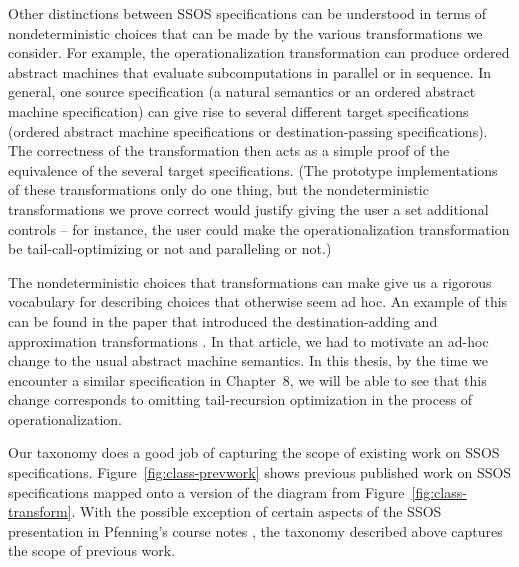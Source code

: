 Other distinctions between SSOS specifications can be understood in
terms of nondeterministic choices that can be made by the various
transformations we consider. For example, the operationalization
transformation can produce ordered abstract machines that evaluate
subcomputations in parallel or in sequence. In general, one source
specification (a natural semantics or an ordered abstract machine
specification) can give rise to several different target
specifications (ordered abstract machine specifications or
destination-passing specifications). The correctness of the
transformation then acts as a simple proof of the equivalence of the
several target specifications. (The prototype implementations of these
transformations only do one thing, but the nondeterministic
transformations we prove correct would justify giving the user a set
additional controls -- for instance, the user could make the
operationalization transformation be tail-call-optimizing or
not and paralleling or not.)

The nondeterministic choices that transformations can make give us a
rigorous vocabulary for describing choices that otherwise seem
ad hoc. An example of this can be found in the paper that introduced
the destination-adding and approximation transformations
\cite{simmons11logical}. In that article, we had to motivate an ad-hoc
change to the usual abstract machine semantics. In this thesis, by the
time we encounter a similar specification in Chapter~8, we will be
able to see that this change corresponds to omitting tail-recursion
optimization in the process of operationalization.

Our taxonomy does a good job of capturing the scope of existing work
on SSOS specifications.  Figure~\ref{fig:class-prevwork} shows
previous published work on SSOS specifications mapped onto a version
of the diagram from Figure~\ref{fig:class-transform}.  With the
possible exception of certain aspects of the SSOS presentation in
Pfenning's course notes \cite{pfenning12substructural}, the taxonomy
described above captures the scope of previous work.


